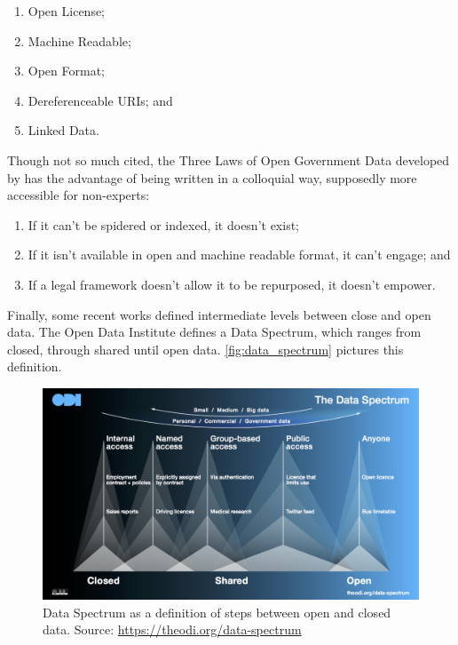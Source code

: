 \begin{enumerate}
	\item Open License;
	\item Machine Readable;
	\item Open Format;
	\item Dereferenceable URIs; and
	\item Linked Data.
\end{enumerate}

Though not so much cited, the Three Laws of Open Government Data developed by  has the advantage of being written in a colloquial way, supposedly more accessible for non-experts:

\begin{enumerate}
	\item If it can't be spidered or indexed, it doesn’t exist;
	\item If it isn’t available in open and machine readable format, it can’t engage; and
	\item If a legal framework doesn’t allow it to be repurposed, it doesn’t empower.
\end{enumerate}

Finally, some recent works defined intermediate levels between close and open data.
The Open Data Institute defines a Data Spectrum, which ranges from closed, through shared until open data. 
\autoref{fig:data_spectrum} pictures this definition.

\begin{figure}[ht]
\begin{center}
\includegraphics[scale=0.3]{images/odi_open_data_spectrum.jpg}
\caption[Data Spectrum as a definition of steps between open and closed data.]{Data Spectrum as a definition of steps between open and closed data. Source: \url{https://theodi.org/data-spectrum}}
\label{fig:data_spectrum}
\end{center}
\end{figure}

